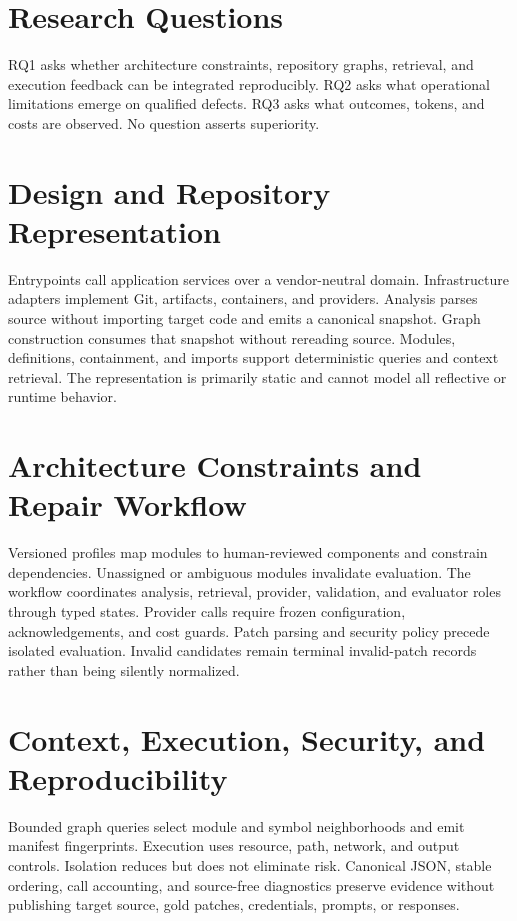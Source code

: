\documentclass[10pt,journal]{IEEEtran}
\begin{document}
\section{Research Questions}
RQ1 asks whether architecture constraints, repository graphs, retrieval, and execution feedback can be
integrated reproducibly. RQ2 asks what operational limitations emerge on qualified defects. RQ3 asks
what outcomes, tokens, and costs are observed. No question asserts superiority.

\section{Design and Repository Representation}
Entrypoints call application services over a vendor-neutral domain. Infrastructure adapters implement
Git, artifacts, containers, and providers. Analysis parses source without importing target code and
emits a canonical snapshot. Graph construction consumes that snapshot without rereading source.
Modules, definitions, containment, and imports support deterministic queries and context retrieval.
The representation is primarily static and cannot model all reflective or runtime behavior.

\section{Architecture Constraints and Repair Workflow}
Versioned profiles map modules to human-reviewed components and constrain dependencies. Unassigned or
ambiguous modules invalidate evaluation. The workflow coordinates analysis, retrieval, provider,
validation, and evaluator roles through typed states. Provider calls require frozen configuration,
acknowledgements, and cost guards. Patch parsing and security policy precede isolated evaluation.
Invalid candidates remain terminal invalid-patch records rather than being silently normalized.

\section{Context, Execution, Security, and Reproducibility}
Bounded graph queries select module and symbol neighborhoods and emit manifest fingerprints.
Execution uses resource, path, network, and output controls. Isolation reduces but does not eliminate
risk. Canonical JSON, stable ordering, call accounting, and source-free diagnostics preserve evidence
without publishing target source, gold patches, credentials, prompts, or responses.
\end{document}
